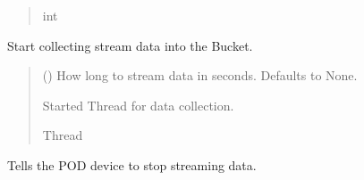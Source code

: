 \documentclass[letterpaper,10pt,english]{sphinxmanual}
\begin{document}
\begin{fulllineitems}
\begin{fulllineitems}
\begin{quote}
\begin{description}
\sphinxAtStartPar
int

\end{description}\end{quote}

\end{fulllineitems}


\begin{fulllineitems}
\label{\detokenize{PodApi.Stream:PodApi.Stream.DataBucket.Bucket.StartCollecting}}
\pysigstartsignatures
{}
\pysigstopsignatures
\sphinxAtStartPar
Start collecting stream data into the Bucket.
\begin{quote}\begin{description}
\sphinxAtStartPar
{} (\sphinxstyleliteralemphasis{\sphinxupquote{ | }}\sphinxstyleliteralemphasis{\sphinxupquote{, }}) \textendash{} How long to stream data in seconds. Defaults to None.

\sphinxAtStartPar
Started Thread for data collection.

\sphinxAtStartPar
Thread

\end{description}\end{quote}

\end{fulllineitems}


\begin{fulllineitems}
\label{\detokenize{PodApi.Stream:PodApi.Stream.DataBucket.Bucket.StopCollecting}}
\pysigstartsignatures
{}
\pysigstopsignatures
\sphinxAtStartPar
Tells the POD device to stop streaming data.


\end{fulllineitems}
\end{fulllineitems}
\end{document}
